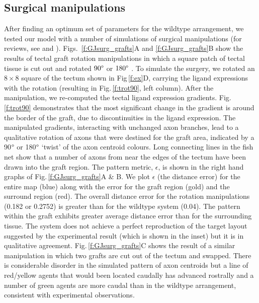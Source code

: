 \documentclass[11pt, a4paper]{article}
\begin{document}
\subsection*{Surgical manipulations}

After finding an optimum set of parameters for the wildtype arrangement, we tested our model with a number of simulations of surgical manipulations (for reviews, see \citet{udin_formation_1988} and \citet{goodhill_retinotectal_1999}). 
Figs.~\ref{f:GJsurg_grafts}A and \ref{f:GJsurg_grafts}B show the results of tectal graft rotation manipulations in which a square patch of tectal tissue is cut out and rotated $90\degree$ or $180\degree$ \citep{chung_observations_1978}. 
%
To simulate the surgery, we rotated an $8\times8$ square of the tectum shown in Fig\,\ref{f:ex}D, carrying the ligand expressions with the rotation (resulting in Fig.\,\ref{f:trot90}, left column). 
After the manipulation, we re-computed the tectal ligand expression gradients. Fig.\,\ref{f:trot90} demonstrates that the most significant change in the gradient is around the border of the graft, due to discontinuities in the ligand expression. 
The manipulated gradients, interacting with unchanged axon branches, lead to a qualitative rotation of axons that were destined for the graft area, indicated by a 90$\degree$ or 180$\degree$ `twist' of the axon centroid colours. 
Long connecting lines in the fish net show that a number of axons from near the edges of the tectum have been drawn into the graft region. 
The pattern metric, $\epsilon$, is shown in the right hand graphs of Fig.\,\ref{f:GJsurg_grafts}A \& B. 
We plot $\epsilon$ (the distance error) for the entire map (blue) along with the error for the graft region (gold) and the surround region (red). 
The overall distance error for the rotation manipulations (0.182 or 0.2752)  is greater than for the wildtype system (0.04). 
The pattern within the graft exhibits greater average distance error than for the surrounding tissue.
The system does not achieve a perfect reproduction of the target layout suggested by the experimental result (which is shown in the inset) but it is in qualitative agreement.
%
Fig.\,\ref{f:GJsurg_grafts}C shows the result of a similar manipulation in which two grafts are cut out of the tectum and swapped. 
There is considerable disorder in the simulated pattern of axon centroids but a line of red/yellow agents that would been located caudally has advanced rostrally and a number of green agents are more caudal than in the wildtype arrangement, consistent with experimental observations.
\end{document}
